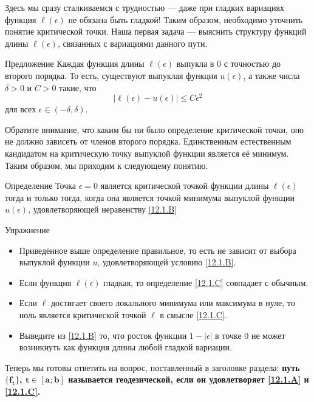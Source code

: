 Здесь мы сразу сталкиваемся с трудностью --- даже при гладких вариациях функция $\ell(\epsilon)$ не обязана быть гладкой!
Таким образом, необходимо уточнить понятие критической точки.
Наша первая задача --- выяснить структуру функций длины $\ell(\epsilon)$, связанных с вариациями данного пути.

\begin{ex}{Предложение}\label{12.1.B}
Каждая функция длины $\ell(\epsilon)$ выпукла в $0$ с точностью до второго порядка.
То есть, существуют выпуклая функция $u(\epsilon)$, а также числа $\delta > 0$ и $C > 0$ такие, что 
\[|\ell(\epsilon) - u(\epsilon)| \le C\epsilon^2\]
для всех $\epsilon \in (-\delta, \delta)$.
\end{ex}

Обратите внимание, что каким бы ни было определение критической точки, оно не должно зависеть от членов второго порядка.
Единственным естественным кандидатом на критическую точку выпуклой функции является её минимум.
Таким образом, мы приходим к следующему понятию.

\begin{ex}{Определение}\label{12.1.C}
Точка $\epsilon = 0$ является критической точкой функции длины $\ell(\epsilon)$ тогда и только тогда, когда она является точкой минимума выпуклой функции $u(\epsilon)$, удовлетворяющей неравенству \ref{12.1.B}
\end{ex}

\begin{ex}{Упражнение}\label{12.1.D}
\begin{itemize}

\item Приведённое выше определение правильное, то есть не зависит от выбора выпуклой функции $u$, удовлетворяющей условию \ref{12.1.B}.


\item Если функция $\ell(\epsilon)$ гладкая, то определение \ref{12.1.C} совпадает с обычным.


\item Если $\ell$ достигает своего локального минимума или максимума в
  нуле, то ноль является критической точкой $\ell$ в смысле
  \ref{12.1.C}. 


\item Выведите из \ref{12.1.B} то, что росток функции $1 - |\epsilon|$
  в точке $0$ не может возникнуть как функция длины любой гладкой
  вариации.
\end{itemize}
\end{ex}

Теперь мы готовы ответить на вопрос, поставленный в заголовке раздела: \textbf{путь $\bm{\{f_t\}}$, $\bm{t\in[a; b]}$ называется геодезической, если он удовлетворяет \ref{12.1.A} и \ref{12.1.C}.}

